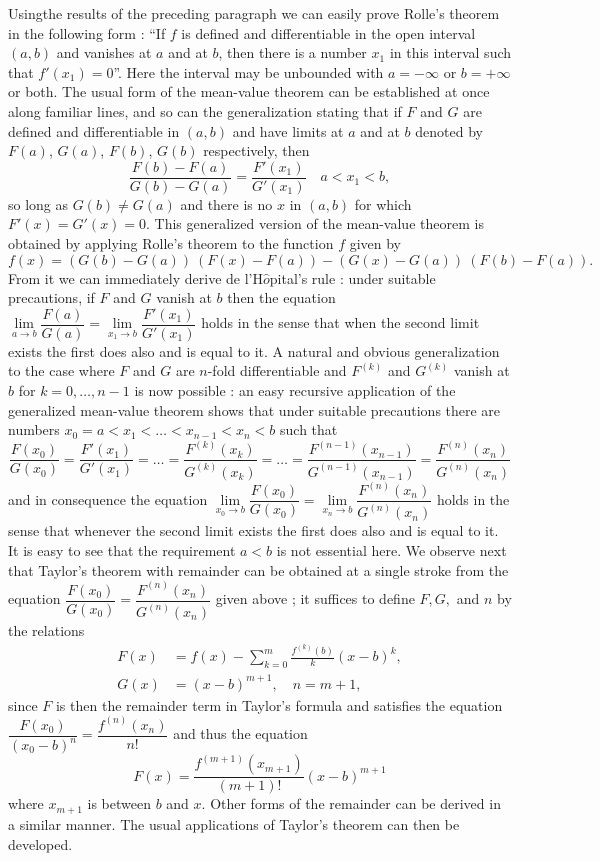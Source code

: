 Using\pageoriginale the results of the preceding paragraph we can
easily prove Rolle's theorem in the following form : ``If $f$ is
defined and differentiable in the open interval $(a,b)$ and vanishes
at $a$ and at $b$, then there is a number $x_1$ in this interval such
that $f'(x_1) = 0$''. Here the interval may be unbounded with $a = -
\infty$ or $b = + \infty$ or both. The usual form of the mean-value
theorem can be established at once along familiar lines, and so can
the generalization stating that if $F$ and $G$ are defined and
differentiable in $(a,b)$ and have limits at $a$ and at $b$ denoted by
$F(a)$, $G(a)$, $F(b)$, $G(b)$ respectively, then
$$
\frac{F(b) - F(a)}{G(b)- G(a)} = \frac{F'(x_1)}{G'(x_1)} \quad a < x_1< b,
$$
so long as $G(b) \neq G(a)$ and there is no $x$ in $(a,b)$ for which
$F'(x) = G'(x) =0$. This generalized version of the mean-value theorem
is obtained by applying Rolle's theorem to the function $f$ given by 
$$
f(x) = (G(b) - G(a))~ (F(x) - F(a)) - (G(x) - G(a))~ (F(b) - F(a)).
$$
From it we can immediately derive de l'H$\hat{o}$pital's rule : under
suitable precautions, if $F$ and $G$ vanish at $b$ then the equation
$\lim\limits_{a \to b} \dfrac{F(a)}{G(a)} = \lim\limits_{x_1 \to b}
\dfrac{F'(x_1)}{G'(x_1)}$ holds in the sense that when the second
limit exists the first does also and is equal to it. A natural and
obvious generalization to the case where $F$ and $G$ are $n$-fold
differentiable and $F^{(k)}$ and $G^{(k)}$ vanish at $b$ for $k = 0,
\ldots, n - 1$ is now possible : an easy recursive application of the
generalized mean-value theorem shows that under suitable precautions
there are numbers $x_0 = a < x_1 < \ldots < x_{n-1} < x_n < b$   such
that 
$$
\frac{F(x_0)}{G(x_0)} = \frac{F'(x_1)}{G'(x_1)} = \ldots =
\frac{F^{(k)}(x_k)}{G^{(k)} (x_k)} = \ldots = \frac{F^{(n-1)}
  (x_{n-1})}{G^{(n-1)} (x_{n-1})} = \frac{F^{(n)} (x_n)}{G^{(n)}(x_n)}
$$
and in consequence the equation $\lim\limits_{x_0 \to b}
\dfrac{F(x_0)}{G(x_0)} = \lim\limits_{x_n \to b}
\dfrac{F^{(n)}(x_n)}{G^{(n)} (x_n)}$ holds in the sense that whenever
the second limit exists the first does also and is equal to it. It is
easy to see that the requirement $a<b$ is not essential here. We
observe next that Taylor's theorem with remainder can be obtained at a
single stroke from the equation $\dfrac{F(x_0)}{G(x_0)} =
\dfrac{F^{(n)} (x_n)}{G^{(n)} (x_n)}$ given above ; it suffices to
define $F, G,$ and $n$ by the relations
\begin{align*}
F(x) & = f(x) -\sum\limits^m_{k=0} \frac{f^{(k)}(b)}{k} (x-b)^k,\\
G(x) & = (x - b)^{m+1}, \quad n = m + 1,
\end{align*}\pageoriginale
since $F$ is then the remainder term in Taylor's formula and satisfies
the equation $\dfrac{F(x_0)}{(x_0 - b)^n} = \dfrac{f^{(n)} (x_n)}{n!}$
and thus the equation
$$
F(x) = \frac{f^{(m+1)} (x_{m+1})}{(m+1)!} (x-b)^{m+1}
$$
where $x_{m+1}$ is between $b$ and $x$. Other forms of the remainder
can be derived in a similar manner. The usual applications of Taylor's
theorem can then be developed.

